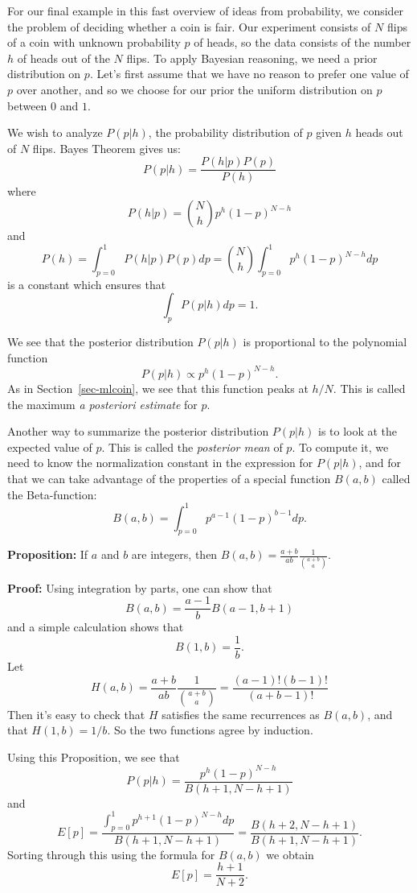 \documentclass[
  11pt,
  letterpaper,
]{scrbook}
\theoremstyle{plain}
\theoremstyle{remark}
\begin{document}
For our final example in this fast overview of ideas from probability,
we consider the problem of deciding whether a coin is fair. Our
experiment consists of \(N\) flips of a coin with unknown probability
\(p\) of heads, so the data consists of the number \(h\) of heads out of
the \(N\) flips. To apply Bayesian reasoning, we need a prior
distribution on \(p\). Let's first assume that we have no reason to
prefer one value of \(p\) over another, and so we choose for our prior
the uniform distribution on \(p\) between \(0\) and \(1\).

We wish to analyze \(P(p|h)\), the probability distribution of \(p\)
given \(h\) heads out of \(N\) flips. Bayes Theorem gives us: \[
P(p|h) = \frac{P(h|p)P(p)}{P(h)}
\] where \[
P(h|p) = \binom{N}{h}p^{h}(1-p)^{N-h}
\] and \[
P(h)=\int_{p=0}^{1} P(h|p)P(p) dp = \binom{N}{h}\int_{p=0}^{1} p^{h}(1-p)^{N-h}dp
\] is a constant which ensures that \[
\int_{p}P(p|h)dp=1.
\]

We see that the posterior distribution \(P(p|h)\) is proportional to the
polynomial function \[
P(p|h)\propto p^{h}(1-p)^{N-h}.
\] As in Section~\ref{sec-mlcoin}, we see that this function peaks at
\(h/N\). This is called the maximum \emph{a posteriori estimate} for
\(p\).

Another way to summarize the posterior distribution \(P(p|h)\) is to
look at the expected value of \(p\). This is called the \emph{posterior
mean} of \(p\). To compute it, we need to know the normalization
constant in the expression for \(P(p|h)\), and for that we can take
advantage of the properties of a special function \(B(a,b)\) called the
Beta-function: \[
B(a,b) = \int_{p=0}^{1} p^{a-1}(1-p)^{b-1} dp.
\]

\textbf{Proposition:} If \(a\) and \(b\) are integers, then
\(B(a,b)=\frac{a+b}{ab}\frac{1}{\binom{a+b}{a}}\).

\textbf{Proof:} Using integration by parts, one can show that \[
B(a,b)=\frac{a-1}{b}B(a-1,b+1)
\] and a simple calculation shows that \[
B(1,b) = \frac{1}{b}.
\] Let \[
H(a,b)=\frac{a+b}{ab}\frac{1}{\binom{a+b}{a}} = \frac{(a-1)!(b-1)!}{(a+b-1)!}
\] Then it's easy to check that \(H\) satisfies the same recurrences as
\(B(a,b)\), and that \(H(1,b)=1/b\). So the two functions agree by
induction.

Using this Proposition, we see that \[
P(p|h) = \frac{p^{h}(1-p)^{N-h}}{B(h+1,N-h+1)}
\] and \[
E[p] = \frac{\int_{p=0}^{1} p^{h+1}(1-p)^{N-h}dp}{B(h+1,N-h+1)}=\frac{B(h+2,N-h+1)}{B(h+1,N-h+1)}.
\] Sorting through this using the formula for \(B(a,b)\) we obtain \[
E[p]=\frac{h+1}{N+2}.
\]
\end{document}
